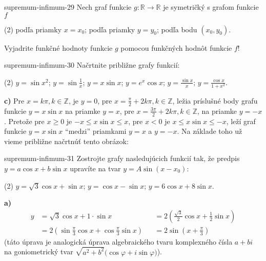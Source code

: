 \begin{defproblem}{supremum-infimum-29}
Nech graf funkcie $g:\mathbb{R}\rightarrow\mathbb{R}$ je symetričký s grafom funkcie $f$
\begin{tasks}(2)
  \task podľa priamky $x=x_0$;
  \task podľa priamky $y=y_0$;
  \task podľa bodu $(x_0,y_0)$.
\end{tasks}
Vyjadrite funkčné hodnoty funkcie $g$ pomocou funkčných hodnôt funkcie $f$!
\end{defproblem}

\begin{defproblem}{supremum-infimum-30}
Načrtnite približne grafy funkcií:
\begin{tasks}(2)
  \task $y=\sin x^2$;
  \task $y=\sin \frac{1}{x}$;
  \task $y=x\sin x$;
  \task $y=e^x\cos x$;
  \task $y=\frac{\sin x}{x}$;
  \task $y=\frac{\cos x}{1+x^2}$.
\end{tasks}

\begin{solution}
  \textbf{c)}
  Pre $x = k \pi, k \in \mathbb{Z}$, je $y = 0$, pre $x = \frac{\pi}{2} +
  2k\pi,k\in\mathbb{Z}$, ležia príslušné body grafu funkcie $y= x \sin{x}$ na
  priamke $y = x$, pre $x = \frac{3\pi}{2} + 2k\pi, k\in\mathbb{Z}$, na priamke
  $y = -x$. Pretože pre $x \geq 0$ je $-x \leq x \sin{x} \leq x$, pre $x < 0$ je
  $x\leq x\sin x\leq -x$, leží graf funkcie $y = x\sin x$ ``medzi'' priamkami $y
  = x$ a $y = -x$. Na základe toho už vieme približne načrtnúť tento obrázok:
\end{solution}
\end{defproblem}

\begin{defproblem}{supremum-infimum-31}
Zostrojte grafy nasledujúcich funkcií tak, že predpis $y=a\cos x +b\sin x$
upravíte na tvar $y=A\sin (x-x_0)$:
\begin{tasks}(2)
  \task $y=\sqrt{3}\cos x +\sin x$;
  \task $y=\cos x -\sin x$;
  \task $y=6\cos x +8\sin x$.
\end{tasks}

\begin{solution}
\textbf{a)}
\begin{align*}
  y
    &= \sqrt{3} \cos{x} + 1 \cdot \sin{x}
      &&= 2(\frac{\sqrt{3}}{2} \cos{x} + \frac{1}{2}\sin{x}) \\
    &= 2(\sin{\frac{\pi}{3}} \cos{x} + \cos{\frac{\pi}{3}}\sin{x})
      &&= 2\sin{(x + \frac{\pi}{3})}
\end{align*}
(táto úprava je analogická úprava algebraického tvaru komplexného čísla $a + bi$
na goniometrický tvar $\sqrt{a^2 + b^2}(\cos{\varphi} + i \sin{\varphi)}$).
\end{solution}
\end{defproblem}

